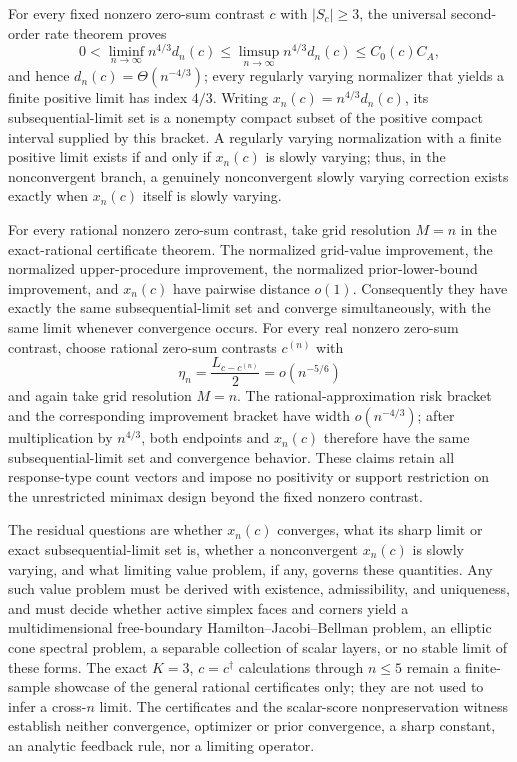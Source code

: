 For every fixed nonzero zero-sum contrast \(c\) with \(|S_c|\geq3\), the universal second-order rate theorem proves
\[
 0<\liminf_{n\to\infty}n^{4/3}d_n(c)
 \leq\limsup_{n\to\infty}n^{4/3}d_n(c)
 \leq C_0(c)C_A,
\]
and hence \(d_n(c)=\Theta(n^{-4/3})\); every regularly varying normalizer that yields a finite positive limit has index \(4/3\). Writing \(x_n(c)=n^{4/3}d_n(c)\), its subsequential-limit set is a nonempty compact subset of the positive compact interval supplied by this bracket. A regularly varying normalization with a finite positive limit exists if and only if \(x_n(c)\) is slowly varying; thus, in the nonconvergent branch, a genuinely nonconvergent slowly varying correction exists exactly when \(x_n(c)\) itself is slowly varying.

For every rational nonzero zero-sum contrast, take grid resolution \(M=n\) in the exact-rational certificate theorem. The normalized grid-value improvement, the normalized upper-procedure improvement, the normalized prior-lower-bound improvement, and \(x_n(c)\) have pairwise distance \(o(1)\). Consequently they have exactly the same subsequential-limit set and converge simultaneously, with the same limit whenever convergence occurs. For every real nonzero zero-sum contrast, choose rational zero-sum contrasts \(c^{(n)}\) with
\[
 \eta_n=\frac{L_{c-c^{(n)}}}{2}=o(n^{-5/6})
\]
and again take grid resolution \(M=n\). The rational-approximation risk bracket and the corresponding improvement bracket have width \(o(n^{-4/3})\); after multiplication by \(n^{4/3}\), both endpoints and \(x_n(c)\) therefore have the same subsequential-limit set and convergence behavior. These claims retain all response-type count vectors and impose no positivity or support restriction on the unrestricted minimax design beyond the fixed nonzero contrast.

The residual questions are whether \(x_n(c)\) converges, what its sharp limit or exact subsequential-limit set is, whether a nonconvergent \(x_n(c)\) is slowly varying, and what limiting value problem, if any, governs these quantities. Any such value problem must be derived with existence, admissibility, and uniqueness, and must decide whether active simplex faces and corners yield a multidimensional free-boundary Hamilton--Jacobi--Bellman problem, an elliptic cone spectral problem, a separable collection of scalar layers, or no stable limit of these forms. The exact \(K=3\), \(c=c^\dagger\) calculations through \(n\leq5\) remain a finite-sample showcase of the general rational certificates only; they are not used to infer a cross-\(n\) limit. The certificates and the scalar-score nonpreservation witness establish neither convergence, optimizer or prior convergence, a sharp constant, an analytic feedback rule, nor a limiting operator.